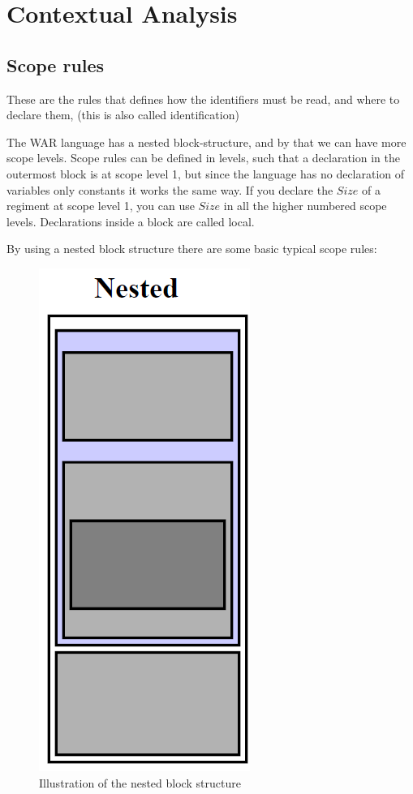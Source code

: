 \section{Contextual Analysis}

	\subsection{Scope rules}
	These are the rules that defines how the identifiers must be read, and where to declare them, (this is also called identification) 
	
	
	The WAR language has a nested block-structure, and by that we can have more scope levels. Scope rules can be defined in levels, such that a declaration in the outermost block is at scope level 1, but since the language has no declaration of variables only constants it works the same way. If you declare the $Size$ of a regiment at scope level 1, you can use $Size$ in all the higher numbered scope levels. Declarations inside a block are called local.
		\newpage

	By using a nested block structure there are some basic typical scope rules:
	\begin{figure}
		\begin{center}
			\includegraphics[scale=1]{rapport/5/figures/nested_block_structure}
		\end{center}	
		\caption{Illustration of the nested block structure}
		\label{nested_block_structure}
	\end{figure}



